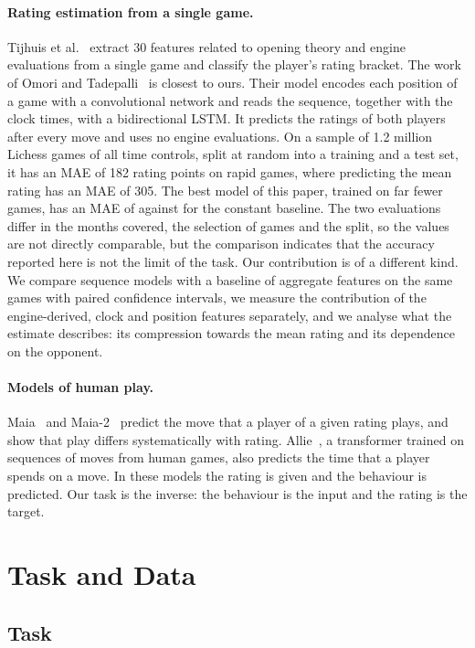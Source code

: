 \documentclass[11pt]{article}
\begin{document}
\paragraph{Rating estimation from a single game.}
Tijhuis et al.~\cite{singlegame} extract 30 features related to opening
theory and engine evaluations from a single game and classify the player's
rating bracket. The work of Omori and Tadepalli~\cite{ratingnet} is closest
to ours. Their model encodes each position of a game with a convolutional
network and reads the sequence, together with the clock times, with a
bidirectional LSTM. It predicts the ratings of both players after every move
and uses no engine evaluations. On a sample of 1.2 million Lichess games of
all time controls, split at random into a training and a test set, it has an
MAE of 182 rating points on rapid games, where predicting the mean rating has
an MAE of 305. The best model of
this paper, trained on far fewer games, has an MAE of  against
 for the constant baseline. The two evaluations differ in the
months covered, the selection of games and the split, so the values are not
directly comparable, but the comparison indicates that the accuracy reported
here is not the limit of the task. Our contribution is of a different kind.
We compare sequence models with a baseline of aggregate features on the same
games with paired confidence intervals, we measure the contribution of the
engine-derived, clock and position features separately, and we analyse what
the estimate describes: its compression towards the mean rating and its
dependence on the opponent.

\paragraph{Models of human play.}
Maia~\cite{maia} and Maia-2~\cite{maia2} predict the move that a player of a
given rating plays, and show that play differs systematically with rating.
Allie~\cite{allie}, a transformer trained on sequences of moves from human
games, also predicts the time that a player spends on a move. In these models
the rating is given and the behaviour is predicted. Our task is the inverse:
the behaviour is the input and the rating is the target.

\section{Task and Data}
\label{sec:data}

\subsection{Task}
\end{document}
